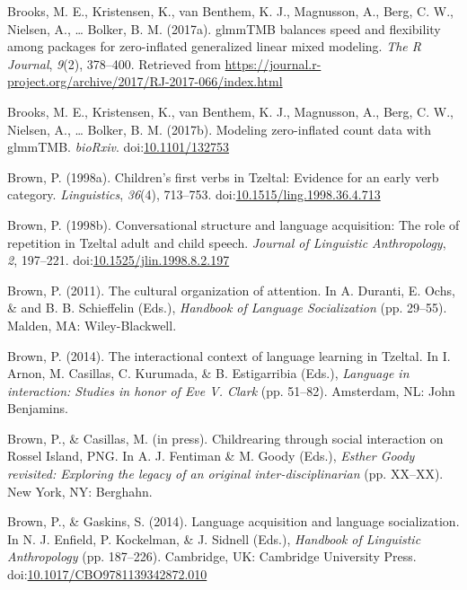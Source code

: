 \documentclass[floatsintext,man]{apa6}
\theoremstyle{definition}
\theoremstyle{definition}
\theoremstyle{definition}
\theoremstyle{remark}
\begin{document}
\hypertarget{ref-R-glmmTMB}{}
Brooks, M. E., Kristensen, K., van Benthem, K. J., Magnusson, A., Berg,
C. W., Nielsen, A., \ldots{} Bolker, B. M. (2017a). glmmTMB balances
speed and flexibility among packages for zero-inflated generalized
linear mixed modeling. \emph{The R Journal}, \emph{9}(2), 378--400.
Retrieved from
\url{https://journal.r-project.org/archive/2017/RJ-2017-066/index.html}

\hypertarget{ref-brooks2017modeling}{}
Brooks, M. E., Kristensen, K., van Benthem, K. J., Magnusson, A., Berg,
C. W., Nielsen, A., \ldots{} Bolker, B. M. (2017b). Modeling
zero-inflated count data with glmmTMB. \emph{bioRxiv}.
doi:\href{https://doi.org/10.1101/132753}{10.1101/132753}

\hypertarget{ref-brown1998childrens}{}
Brown, P. (1998a). Children's first verbs in Tzeltal: Evidence for an
early verb category. \emph{Linguistics}, \emph{36}(4), 713--753.
doi:\href{https://doi.org/10.1515/ling.1998.36.4.713}{10.1515/ling.1998.36.4.713}

\hypertarget{ref-brown1998conversational}{}
Brown, P. (1998b). Conversational structure and language acquisition:
The role of repetition in Tzeltal adult and child speech. \emph{Journal
of Linguistic Anthropology}, \emph{2}, 197--221.
doi:\href{https://doi.org/10.1525/jlin.1998.8.2.197}{10.1525/jlin.1998.8.2.197}

\hypertarget{ref-brown2011cultural}{}
Brown, P. (2011). The cultural organization of attention. In A. Duranti,
E. Ochs, \& and B. B. Schieffelin (Eds.), \emph{Handbook of Language
Socialization} (pp. 29--55). Malden, MA: Wiley-Blackwell.

\hypertarget{ref-brown2014interactional}{}
Brown, P. (2014). The interactional context of language learning in
Tzeltal. In I. Arnon, M. Casillas, C. Kurumada, \& B. Estigarribia
(Eds.), \emph{Language in interaction: Studies in honor of Eve V. Clark}
(pp. 51--82). Amsterdam, NL: John Benjamins.

\hypertarget{ref-brownIPchildrearing}{}
Brown, P., \& Casillas, M. (in press). Childrearing through social
interaction on Rossel Island, PNG. In A. J. Fentiman \& M. Goody (Eds.),
\emph{Esther Goody revisited: Exploring the legacy of an original
inter-disciplinarian} (pp. XX--XX). New York, NY: Berghahn.

\hypertarget{ref-brown2014language}{}
Brown, P., \& Gaskins, S. (2014). Language acquisition and language
socialization. In N. J. Enfield, P. Kockelman, \& J. Sidnell (Eds.),
\emph{Handbook of Linguistic Anthropology} (pp. 187--226). Cambridge,
UK: Cambridge University Press.
doi:\href{https://doi.org/10.1017/CBO9781139342872.010}{10.1017/CBO9781139342872.010}
\end{document}
